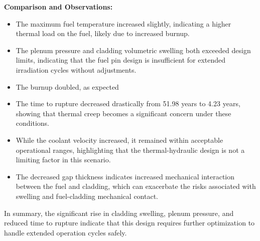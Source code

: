 \textbf{Comparison and Observations:}
\begin{itemize}
    \item The maximum fuel temperature increased slightly, indicating a higher thermal load on the fuel, likely due to increased burnup.
    \item The plenum pressure and cladding volumetric swelling both exceeded design limits, indicating that the fuel pin design is insufficient for extended irradiation cycles without adjustments.
    \item The burnup doubled, as expected
    \item The time to rupture decreased drastically from 51.98 years to 4.23 years, showing that thermal creep becomes a significant concern under these conditions.
    \item While the coolant velocity increased, it remained within acceptable operational ranges, highlighting that the thermal-hydraulic design is not a limiting factor in this scenario.
    \item The decreased gap thickness indicates increased mechanical interaction between the fuel and cladding, which can exacerbate the risks associated with swelling and fuel-cladding mechanical contact.
\end{itemize}

In summary, the significant rise in cladding swelling, plenum pressure, and reduced time to rupture indicate that this design requires further optimization to handle extended operation cycles safely.